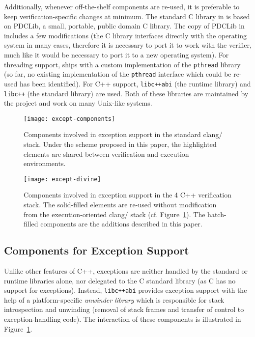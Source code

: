 Additionally, whenever off-the-shelf components are re-used, it is
preferable to keep verification-specific changes at minimum. The
standard C library in \divine{} is based on PDCLib, a small, portable,
public domain C library. The copy of PDCLib in \divine{} includes a few
modifications (the C library interfaces directly with the operating
system in many cases, therefore it is necessary to port it to work with
the verifier, much like it would be necessary to port it to a new
operating system). For threading support, \divine{} ships with a custom
implementation of the \texttt{pthread} library (so far, no existing
implementation of the \texttt{pthread} interface which could be re-used
has been identified). For C++ support, \texttt{libc++abi} (the runtime
library) and \texttt{libc++} (the standard library) are used. Both of
these libraries are maintained by the \llvm{} project and work on many
Unix-like systems.

\begin{figure}
\centering
\texttt{[image: except-components]}
\caption{Components involved in exception support in the standard
clang/\llvm{} stack. Under the scheme proposed in this paper, the
highlighted elements are shared between verification and execution
environments.}\label{fig:components}
\end{figure}

\begin{figure}
\centering
\texttt{[image: except-divine]}
\caption{Components involved in exception support in the \divine{} 4 C++
verification stack. The solid-filled elements are re-used without
modification from the execution-oriented clang/\llvm{} stack (cf.
Figure~\ref{fig:components}). The hatch-filled components are the
additions described in this paper.}\label{fig:divine}
\end{figure}

\subsection{Components for Exception
Support}\label{components-for-exception-support}

Unlike other features of C++, exceptions are neither handled by the
standard or runtime libraries alone, nor delegated to the C standard
library (as C has no support for exceptions). Instead,
\texttt{libc++abi} provides exception support with the help of a
platform-specific \emph{unwinder library} which is responsible for stack
introspection and unwinding (removal of stack frames and transfer of
control to exception-handling code). The interaction of these components
is illustrated in Figure~\ref{fig:components}.

